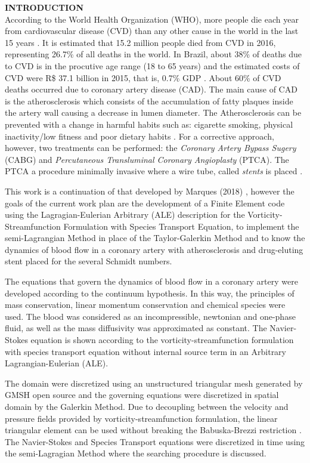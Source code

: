 \noindent\textbf{INTRODUCTION}
\\

According to the World Health Organization (WHO), more people die each year from cardiovascular disease (CVD) than any other cause in the world in the last 15 years \cite{oms2018}.
It is estimated that 15.2 million people died from CVD in 2016,
representing 26.7\% of all deaths in the world. 
In Brazil, about 38\% of deaths due to CVD is in the procutive age range
(18 to 65 years) and the estimated
costs of CVD were R\$ 37.1 billion
in 2015, that is, 0.7\% GDP \cite{siqueira2017}.
About 60\% of CVD deaths
occurred due to coronary artery disease (CAD).
The main cause of CAD is the atherosclerosis which consists of
the accumulation of fatty plaques inside the artery wall causing
a decrease in lumen diameter.
The Atherosclerosis can be prevented with a change in harmful habits
such as: cigarette smoking, physical inactivity/low fitness and poor dietary habits \cite{spring2013}.
For a corrective approach, however, two treatments can be performed:
the \textit{Coronary Artery Bypass Sugery} (CABG) and
\textit{Percutaneous Transluminal Coronary Angioplasty} (PTCA).
The PTCA a procedure minimally invasive where a wire tube,
called \textit{stents} is placed \cite{sigwart1987}.

\medskip
This work is a continuation of that developed by Marques (2018)
\cite{bsc2018}, however
the goals of the current work plan are the development of a
Finite Element code using the Lagragian-Eulerian Arbitrary (ALE) 
description for the Vorticity-Streamfunction Formulation 
with Species Transport Equation, to implement the semi-Lagrangian Method
in place of the Taylor-Galerkin Method and
to know the dynamics of blood flow in a 
coronary artery with atherosclerosis and drug-eluting stent placed
for the several Schmidt numbers.

\medskip
The equations that govern the dynamics of blood flow in a coronary artery were developed according to the continuum hypothesis.
In this way, the principles of mass conservation, linear momentum conservation and chemical species were used.
The blood was considered as an incompressible, newtonian and one-phase 
fluid, as well as the mass diffusivity was approximated as constant.
The Navier-Stokes equation is shown according to the 
vorticity-streamfunction formulation with species transport 
equation without internal source term in an 
Arbitrary Lagrangian-Eulerian (ALE).

\medskip
The domain were discretized using an unstructured triangular 
mesh generated by GMSH open source \cite{gmsh} and 
the governing equations were discretized in spatial domain 
by the Galerkin Method. 
Due to decoupling between the velocity and pressure fields 
provided by vorticity-streamfunction formulation, the linear 
triangular element can be used without breaking the 
Babuska-Brezzi restriction \cite{babuska1971}\cite{brezzi1974}.
The Navier-Stokes and Species Transport equations were 
discretized in time using the semi-Lagragian Method 
\cite{pironneau1982} where the searching procedure is
discussed.

